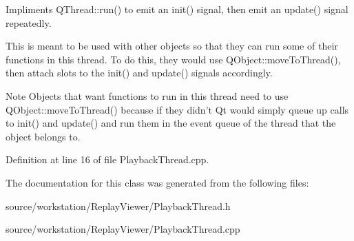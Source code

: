 Impliments Q\-Thread\-::run() to emit an init() signal, then emit an update() signal repeatedly. 

This is meant to be used with other objects so that they can run some of their functions in this thread. To do this, they would use Q\-Object\-::move\-To\-Thread(), then attach slots to the init() and update() signals accordingly. \begin{DoxyNote}{Note}
Objects that want functions to run in this thread need to use Q\-Object\-::move\-To\-Thread() because if they didn't Qt would simply queue up calls to init() and update() and run them in the event queue of the thread that the object belongs to. 
\end{DoxyNote}


Definition at line 16 of file Playback\-Thread.\-cpp.



The documentation for this class was generated from the following files\-:\begin{DoxyCompactItemize}
\item 
source/workstation/\-Replay\-Viewer/Playback\-Thread.\-h\item 
source/workstation/\-Replay\-Viewer/Playback\-Thread.\-cpp\end{DoxyCompactItemize}

